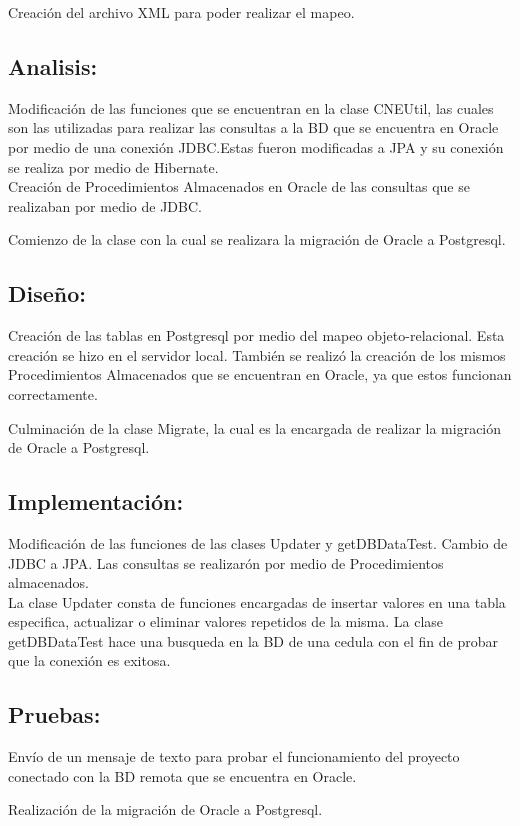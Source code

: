 \documentclass[spanish]{article}
\begin{document}
Creación del archivo XML para poder realizar el mapeo. 

 
\subsection{Analisis:}
Modificación de las funciones que se encuentran en la clase CNEUtil, las cuales son las utilizadas para realizar las consultas a la BD que se encuentra en Oracle por medio de una conexión JDBC.Estas fueron modificadas a JPA y su conexión se realiza por medio de Hibernate. \\

Creación de Procedimientos Almacenados en Oracle de las consultas que se realizaban por medio de JDBC. 

Comienzo de la clase con la cual se realizara la migración de Oracle a Postgresql.

\subsection{Diseño:}

Creación de las tablas en Postgresql por medio del mapeo objeto-relacional. Esta creación se hizo en el servidor local. También se realizó la creación de los mismos Procedimientos Almacenados que se encuentran en Oracle, ya que estos funcionan correctamente.  

Culminación de la clase Migrate, la cual es la encargada de realizar la migración de Oracle a Postgresql.

\subsection{Implementación:}

Modificación de las funciones de las clases Updater y getDBDataTest. Cambio de JDBC a JPA. Las consultas se realizarón por medio de Procedimientos almacenados.\\
 
La clase Updater consta de funciones encargadas de insertar valores en una tabla especifica, actualizar o eliminar valores repetidos de la misma. La clase getDBDataTest hace una busqueda en la BD de una cedula con el fin de probar que la conexión es exitosa.

\subsection{Pruebas:}

Envío de un mensaje de texto para probar el funcionamiento del proyecto conectado con la BD remota que se encuentra en Oracle.
  
Realización de la migración de Oracle a Postgresql.


 

	
\end{document}
